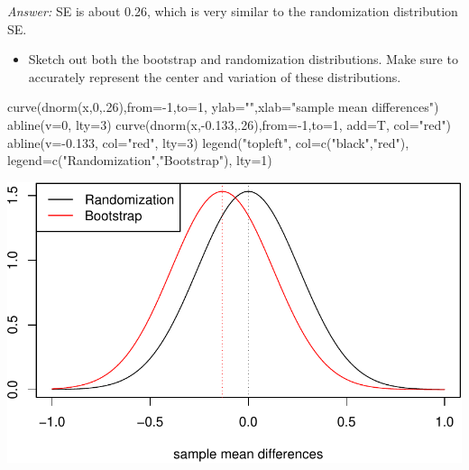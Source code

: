\documentclass[
]{book}
\newenvironment{Shaded}{\begin{snugshade}}{\end{snugshade}}
\newcommand{\AttributeTok}[1]{\textcolor[rgb]{0.77,0.63,0.00}{#1}}
\newcommand{\DecValTok}[1]{\textcolor[rgb]{0.00,0.00,0.81}{#1}}
\newcommand{\FloatTok}[1]{\textcolor[rgb]{0.00,0.00,0.81}{#1}}
\newcommand{\FunctionTok}[1]{\textcolor[rgb]{0.00,0.00,0.00}{#1}}
\newcommand{\NormalTok}[1]{#1}
\newcommand{\SpecialCharTok}[1]{\textcolor[rgb]{0.00,0.00,0.00}{#1}}
\newcommand{\StringTok}[1]{\textcolor[rgb]{0.31,0.60,0.02}{#1}}
\providecommand{\tightlist}{%
  \setlength{\itemsep}{0pt}\setlength{\parskip}{0pt}}
\begin{document}
\emph{Answer:} SE is about 0.26, which is very similar to the randomization distribution SE.

\begin{itemize}
\tightlist
\item
  Sketch out both the bootstrap and randomization distributions. Make sure to accurately represent the center and variation of these distributions.
\end{itemize}

\begin{Shaded}
\begin{Highlighting}[]
\FunctionTok{curve}\NormalTok{(}\FunctionTok{dnorm}\NormalTok{(x,}\DecValTok{0}\NormalTok{,.}\DecValTok{26}\NormalTok{),}\AttributeTok{from=}\SpecialCharTok{{-}}\DecValTok{1}\NormalTok{,}\AttributeTok{to=}\DecValTok{1}\NormalTok{, }\AttributeTok{ylab=}\StringTok{""}\NormalTok{,}\AttributeTok{xlab=}\StringTok{"sample mean differences"}\NormalTok{)}
\FunctionTok{abline}\NormalTok{(}\AttributeTok{v=}\DecValTok{0}\NormalTok{, }\AttributeTok{lty=}\DecValTok{3}\NormalTok{)}
\FunctionTok{curve}\NormalTok{(}\FunctionTok{dnorm}\NormalTok{(x,}\SpecialCharTok{{-}}\FloatTok{0.133}\NormalTok{,.}\DecValTok{26}\NormalTok{),}\AttributeTok{from=}\SpecialCharTok{{-}}\DecValTok{1}\NormalTok{,}\AttributeTok{to=}\DecValTok{1}\NormalTok{, }\AttributeTok{add=}\NormalTok{T, }\AttributeTok{col=}\StringTok{"red"}\NormalTok{)}
\FunctionTok{abline}\NormalTok{(}\AttributeTok{v=}\SpecialCharTok{{-}}\FloatTok{0.133}\NormalTok{, }\AttributeTok{col=}\StringTok{"red"}\NormalTok{, }\AttributeTok{lty=}\DecValTok{3}\NormalTok{)}
\FunctionTok{legend}\NormalTok{(}\StringTok{"topleft"}\NormalTok{, }\AttributeTok{col=}\FunctionTok{c}\NormalTok{(}\StringTok{"black"}\NormalTok{,}\StringTok{"red"}\NormalTok{), }\AttributeTok{legend=}\FunctionTok{c}\NormalTok{(}\StringTok{"Randomization"}\NormalTok{,}\StringTok{"Bootstrap"}\NormalTok{), }\AttributeTok{lty=}\DecValTok{1}\NormalTok{)}
\end{Highlighting}
\end{Shaded}

\includegraphics[width=1\linewidth]{Class_Activity_13_files/figure-latex/unnamed-chunk-6-1}
\end{document}
